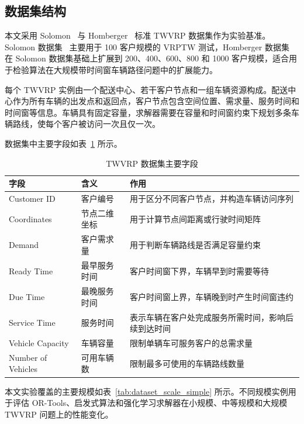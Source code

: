 \documentclass[12pt,a4paper,UTF8]{article}
\begin{document}
\subsection{数据集结构}

本文采用 Solomon~\cite{solomon1987algorithms} 与 Homberger~\cite{homberger1999two} 标准 TWVRP 数据集作为实验基准。Solomon 数据集~\cite{solomon1987algorithms} 主要用于 100 客户规模的 VRPTW 测试，Homberger 数据集~\cite{homberger1999two} 在 Solomon 数据集基础上扩展到 200、400、600、800 和 1000 客户规模，适合用于检验算法在大规模带时间窗车辆路径问题中的扩展能力。

每个 TWVRP 实例由一个配送中心、若干客户节点和一组车辆资源构成。配送中心作为所有车辆的出发点和返回点，客户节点包含空间位置、需求量、服务时间和时间窗等信息。车辆具有固定容量，求解器需要在容量和时间窗约束下规划多条车辆路线，使每个客户被访问一次且仅一次。

数据集中主要字段如表~\ref{tab:dataset_structure} 所示。

\begin{table}[!htbp]
    \centering
    \caption{TWVRP 数据集主要字段}
    \label{tab:dataset_structure}
    \small
    \begin{tabularx}{\textwidth}{p{3.2cm} p{4.0cm} X}
        \toprule
        字段 & 含义 & 作用 \\
        \midrule
        Customer ID & 客户编号 & 用于区分不同客户节点，并构造车辆访问序列 \\
        Coordinates & 节点二维坐标 & 用于计算节点间距离或行驶时间矩阵 \\
        Demand & 客户需求量 & 用于判断车辆路线是否满足容量约束 \\
        Ready Time & 最早服务时间 & 客户时间窗下界，车辆早到时需要等待 \\
        Due Time & 最晚服务时间 & 客户时间窗上界，车辆晚到时产生时间窗违约 \\
        Service Time & 服务时间 & 表示车辆在客户处完成服务所需时间，影响后续到达时间 \\
        Vehicle Capacity & 车辆容量 & 限制单辆车可服务客户的总需求量 \\
        Number of Vehicles & 可用车辆数 & 限制最多可使用的车辆路线数量 \\
        \bottomrule
    \end{tabularx}
\end{table}

本文实验覆盖的主要规模如表~\ref{tab:dataset_scale_simple} 所示。不同规模实例用于评估 OR-Tools、启发式算法和强化学习求解器在小规模、中等规模和大规模 TWVRP 问题上的性能变化。
\end{document}

